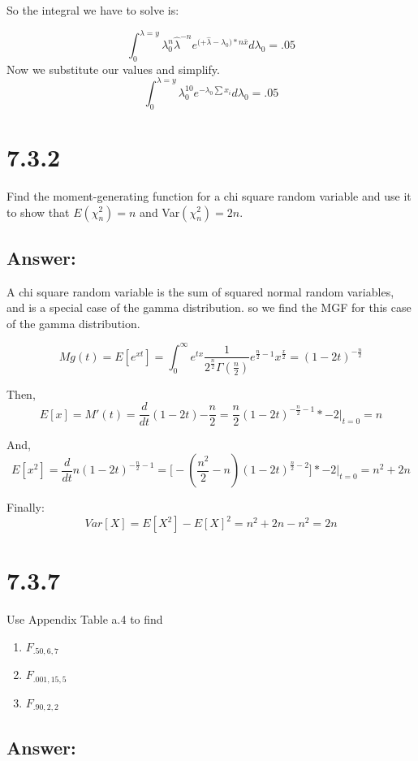 \documentclass[svgnames]{article}
\begin{document}
So the integral we have to solve is:

$$\int^{\lambda = y }_{0} \lambda_{0}^n\hat{\lambda}^{-n}e^{({+\hat{\lambda}-\lambda_{0})* n \bar{x}}} d\lambda_{0} =.05$$
Now we substitute our values and simplify.
$$\int^{\lambda = y }_{0} \lambda_{0}^{10}e^{-\lambda_{0}\sum x_i} d\lambda_{0} =.05 $$

\section{7.3.2}
 Find the moment-generating function for a chi square random variable and use it to show that $E(\chi_n^2) = n$ and Var$(\chi_n^2) = 2n$. 

\subsection*{Answer:}
A chi square random variable is the sum of squared normal random variables, and is a special case of the gamma distribution. so we find the MGF for this case of the gamma distribution. 

$$Mg(t)=E[e^{xt}]=\int_{0}^{\infty}e^{tx}\frac{1}{2^{\frac{n}{2}}\Gamma(\frac{n}{2})}e^{\frac{n}{2}-1}x^{\frac{x}{2}}=(1-2t)^{-\frac{n}{2}}$$

Then,
$$E[x]=M'(t)=\frac{d}{dt}(1-2t){-\frac{n}{2}}=\frac{n}{2}(1-2t)^{-\frac{n}{2}-1}*-2\Big|_{t=0}=n$$

And,
$$E[x^2]=\frac{d}{dt}n(1-2t)^{-\frac{n}{2}-1}=\Big[-( \frac{n^2}{2}-n)(1-2t)^{\frac{n}{2}-2}\Big]*-2\Big|_{t=0}=n^2+2n$$

Finally:
$$Var[X]=E[X^2]-E[X]^2=n^2+2n - n^2= 2n$$


\section{7.3.7}
Use Appendix Table a.4 to find
\begin{enumerate}[label = (\alph*)]
\item $F_{.50,6,7}$
\item $F_{.001,15,5}$
\item $F_{.90,2,2}$
\end{enumerate}
\subsection*{Answer:}
\end{document}
